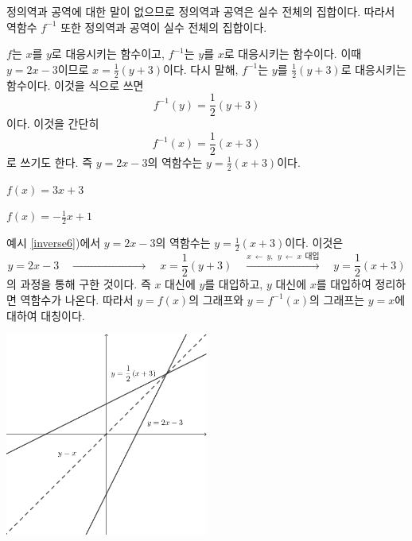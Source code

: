 \documentclass{oblivoir}
\begin{document}
%
\label{inverse5}

\newpage
%
\label{inverse6}
\begin{mdframed}
정의역과 공역에 대한 말이 없으므로 정의역과 공역은 실수 전체의 집합이다.
따라서 역함수 \(f^{-1}\) 또한 정의역과 공역이 실수 전체의 집합이다.


\(f\)는 \(x\)를 \(y\)로 대응시키는 함수이고, \(f^{-1}\)는 \(y\)를 \(x\)로 대응시키는 함수이다.
이때  \(y=2x-3\)이므로 \(x=\frac12(y+3)\)이다.
다시 말해, \(f^{-1}\)는 \(y\)를 \(\frac12(y+3)\)로 대응시키는 함수이다.
이것을 식으로 쓰면
\[f^{-1}(y)=\frac12(y+3)\]
이다.
%
이것을 간단히
\[f^{-1}(x)=\frac12(x+3)\]
로 쓰기도 한다.
즉 \(y=2x-3\)의 역함수는 \(y=\frac12(x+3)\)이다.
\end{mdframed}

%
\label{inverse7}
\begin{enumerate*}[itemjoin={\tabto{0.5\textwidth}}]
\item
\(f(x)=3x+3\)
\item
\(f(x)=-\frac12x+1\)
\end{enumerate*}

\newpage
%
\exam{}\label{inverse8}
예시 \ref{inverse6})에서 \(y=2x-3\)의 역함수는 \(y=\frac12(x+3)\)이다.
이것은
\[y=2x-3
\quad\xrightarrow{\phantom{x\:\leftarrow\: y,\:\: y\:\leftarrow\: x\:\:\text{대입}}}\quad
x=\frac12(y+3)
\quad\xrightarrow{x\:\leftarrow\: y,\:\: y\:\leftarrow\: x\:\:\text{대입}}\quad
y=\frac12(x+3)
\]
의 과정을 통해 구한 것이다.
즉 \(x\) 대신에 \(y\)를 대입하고, \(y\) 대신에 \(x\)를 대입하여 정리하면 역함수가 나온다.
따라서 \(y=f(x)\)의 그래프와 \(y=f^{-1}(x)\)의 그래프는 \(y=x\)에 대하여 대칭이다.
\begin{center}
\includegraphics[width=0.5\textwidth]{inverse_6}
\end{center}
\end{document}
